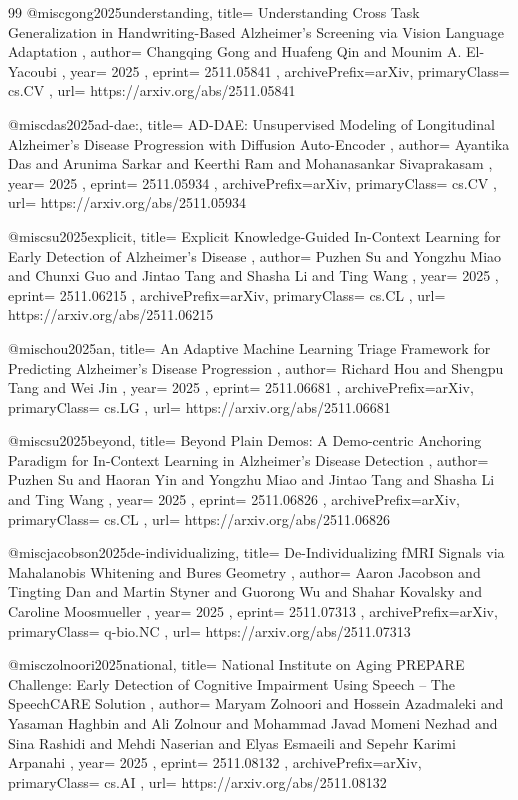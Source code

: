 \documentclass[11pt,a4paper]{article}
\begin{document}
\begin{thebibliography}{99}
@misc{gong2025understanding,
  title={ Understanding Cross Task Generalization in Handwriting-Based Alzheimer's Screening via Vision Language Adaptation },
  author={ Changqing Gong and Huafeng Qin and Mounim A. El-Yacoubi },
  year={ 2025 },
  eprint={ 2511.05841 },
  archivePrefix={arXiv},
  primaryClass={ cs.CV },
  url={ https://arxiv.org/abs/2511.05841 }
}


@misc{das2025ad-dae:,
  title={ AD-DAE: Unsupervised Modeling of Longitudinal Alzheimer's Disease Progression with Diffusion Auto-Encoder },
  author={ Ayantika Das and Arunima Sarkar and Keerthi Ram and Mohanasankar Sivaprakasam },
  year={ 2025 },
  eprint={ 2511.05934 },
  archivePrefix={arXiv},
  primaryClass={ cs.CV },
  url={ https://arxiv.org/abs/2511.05934 }
}


@misc{su2025explicit,
  title={ Explicit Knowledge-Guided In-Context Learning for Early Detection of Alzheimer's Disease },
  author={ Puzhen Su and Yongzhu Miao and Chunxi Guo and Jintao Tang and Shasha Li and Ting Wang },
  year={ 2025 },
  eprint={ 2511.06215 },
  archivePrefix={arXiv},
  primaryClass={ cs.CL },
  url={ https://arxiv.org/abs/2511.06215 }
}


@misc{hou2025an,
  title={ An Adaptive Machine Learning Triage Framework for Predicting Alzheimer's Disease Progression },
  author={ Richard Hou and Shengpu Tang and Wei Jin },
  year={ 2025 },
  eprint={ 2511.06681 },
  archivePrefix={arXiv},
  primaryClass={ cs.LG },
  url={ https://arxiv.org/abs/2511.06681 }
}


@misc{su2025beyond,
  title={ Beyond Plain Demos: A Demo-centric Anchoring Paradigm for In-Context Learning in Alzheimer's Disease Detection },
  author={ Puzhen Su and Haoran Yin and Yongzhu Miao and Jintao Tang and Shasha Li and Ting Wang },
  year={ 2025 },
  eprint={ 2511.06826 },
  archivePrefix={arXiv},
  primaryClass={ cs.CL },
  url={ https://arxiv.org/abs/2511.06826 }
}


@misc{jacobson2025de-individualizing,
  title={ De-Individualizing fMRI Signals via Mahalanobis Whitening and Bures Geometry },
  author={ Aaron Jacobson and Tingting Dan and Martin Styner and Guorong Wu and Shahar Kovalsky and Caroline Moosmueller },
  year={ 2025 },
  eprint={ 2511.07313 },
  archivePrefix={arXiv},
  primaryClass={ q-bio.NC },
  url={ https://arxiv.org/abs/2511.07313 }
}


@misc{zolnoori2025national,
  title={ National Institute on Aging PREPARE Challenge: Early Detection of Cognitive Impairment Using Speech -- The SpeechCARE Solution },
  author={ Maryam Zolnoori and Hossein Azadmaleki and Yasaman Haghbin and Ali Zolnour and Mohammad Javad Momeni Nezhad and Sina Rashidi and Mehdi Naserian and Elyas Esmaeili and Sepehr Karimi Arpanahi },
  year={ 2025 },
  eprint={ 2511.08132 },
  archivePrefix={arXiv},
  primaryClass={ cs.AI },
  url={ https://arxiv.org/abs/2511.08132 }
}



\end{thebibliography}
\end{document}
